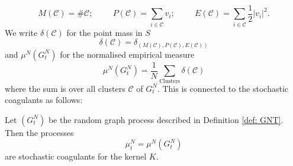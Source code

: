 \begin{equation}
   M(\mathcal{C})=\#\mathcal{C}; \hspace{1cm} P(\mathcal{C})=\sum_{i\in \mathcal{C}} v_i;\hspace{1cm} E(\mathcal{C})=\sum_{i\in \mathcal{C}} \frac{1}{2}|v_i|^2.
\end{equation} We write $\delta(\mathcal{C})$ for the point mass in $S$ \begin{equation}
    \delta(\mathcal{C})=\delta_{(M(\mathcal{C}),P(\mathcal{C}),E(\mathcal{C}))}
\end{equation} and $\mu^N(G^N_t)$ for the normalised empirical measure \begin{equation} \mu^N(G^N_t)=\frac{1}{N}\sum_\text{Clusters} \delta(\mathcal{C})\end{equation} where the sum is over all clusters $\mathcal{C}$ of $G^N_t$. This is connected to the stochastic coagulants as follows:
\begin{lemma}\label{lemma: coupling} Let $(G^N_t)$ be the random graph process described in Definition \ref{def: GNT}. Then the processes \begin{equation}
    \mu^N_t=\mu^N(G^N_t)
\end{equation} are stochastic coagulants for the kernel $K$.
\end{lemma}

